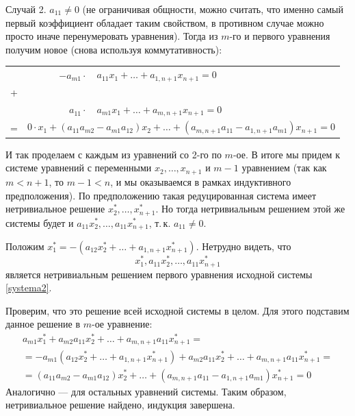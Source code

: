 \begin{enumerate}
Случай 2. $a_{11}\ne 0$ (не ограничивая общности, можно считать, что именно самый первый коэффициент обладает таким свойством, в противном случае можно просто иначе перенумеровать уравнения). Тогда из $m$-го и первого уравнения получим новое (снова используя коммутативность):
\begin{center}
\begin{tabular}{rr|l}
& $-a_{m1}\cdot$  & $a_{11}x_1+\dots+a_{1,n+1}x_{n+1}=0$ \\[-5pt]
+ & & \\[-5pt]
& $a_{11}\cdot$ & $a_{m1}x_1+\dots+a_{m,n+1}x_{n+1}=0$\\ \hline
= & \multicolumn{2}{l}{$0\cdot x_1+(a_{11}a_{m2}-a_{m1}a_{12})x_2+\dots+(a_{m,n+1}a_{11}-a_{1,n+1}a_{m1})x_{n+1}=0$}
\end{tabular}
\end{center}
И так проделаем с каждым из уравнений со 2-го по $m$-ое. В итоге мы придем к системе уравнений с переменными $x_2,\dots,x_{n+1}$ и $m-1$ уравнением (так как $m<n+1$, то $m-1<n$, и мы оказываемся в рамках индуктивного предположения). По предположению такая редуцированная система имеет нетривиальное решение $x_2^*,\dots,x_{n+1}^*$. Но тогда нетривиальным решением этой же системы будет и $a_{11}x_2^*,\dots,a_{11}x_{n+1}^*$, т.\,к. $a_{11}\ne 0$.

Положим $x_1^*=-(a_{12}x_2^*+\dots+a_{1,n+1}x_{n+1}^*)$. Нетрудно видеть, что 
$$
x_1^*,a_{11}x_2^*,\dots,a_{11}x_{n+1}^*
$$ является нетривиальным решением первого уравнения исходной системы \eqref{systema2}.

Проверим, что это решение всей исходной системы в целом. Для этого подставим данное решение в $m$-ое уравнение:
\begin{gather*}
a_{m1}x_1^*+a_{m2}a_{11}x_2^*+\dots+a_{m,n+1}a_{11}x_{n+1}^*=\\
=-a_{m1}(a_{12}x_2^*+\dots+a_{1,n+1}x_{n+1}^*)+a_{m2}a_{11}x_2^*+\dots+a_{m,n+1}a_{11}x_{n+1}^*=\\
=(a_{11}a_{m2}-a_{m1}a_{12})x_2^*+\dots+(a_{m,n+1}a_{11}-a_{1,n+1}a_{m1})x_{n+1}^*=0
\end{gather*}
Аналогично --- для остальных уравнений системы. Таким образом, нетривиальное решение найдено, индукция завершена.
\epf


\end{enumerate}
